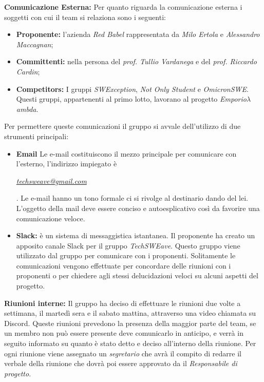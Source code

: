 \textbf{Comunicazione Esterna:}
Per quanto riguarda la comunicazione esterna i soggetti con cui il team si relaziona sono i seguenti:
\begin{itemize}
    \item \textbf{Proponente:} l'azienda \textit{Red Babel} rappresentata da \textit{Milo Ertola} e \textit{Alessandro Maccagnan};
    \item \textbf{Committenti:} nella persona del \textit{prof. Tullio Vardanega} e del \textit{prof. Riccardo Cardin};
    \item \textbf{Competitors:} I gruppi \textit{SWException}, \textit{Not Only Student} e \textit{OmicronSWE}. Questi gruppi, appartenenti al primo lotto, lavorano al progetto \textit{Emporio\(\lambda\)ambda}.
\end{itemize}
Per permettere queste comunicazioni il gruppo si avvale dell'utilizzo di due strumenti principali:
\begin{itemize}
    \item \textbf{Email}
          Le e-mail costituiscono il mezzo principale per comunicare con l'esterno, l'indirizzo impiegato è
          \begin{center}
              \textit{\href{mailto:techsweave@gmail.com}{techsweave@gmail.com}}\end{center}. Le e-mail hanno un tono formale ci si rivolge al destinario dando del lei. L'oggetto della mail deve essere conciso e autoesplicativo così da favorire una comunicazione veloce.
    \item \textbf{Slack:}
          è un sistema di messaggistica istantanea. Il proponente ha creato un apposito canale Slack per il gruppo \textit{TechSWEave}. Questo gruppo viene utilizzato dal gruppo per comunicare con i proponenti. Solitamente le comunicazioni vengono effettuate per concordare delle riunioni con i proponenti o per chiedere agli stessi delucidazioni veloci su alcuni aspetti del progetto.
\end{itemize}
\textbf{Riunioni interne:}
Il gruppo ha deciso di effettuare le riunioni due volte a settimana, il martedì sera e il sabato mattina, attraverso una video chiamata su Discord. Queste riunioni prevedono la presenza della maggior parte del team, se un membro non può essere presente deve comunicarlo in anticipo, e verrà in seguito informato su quanto è stato detto e deciso all'interno della riunione. Per ogni riunione viene assegnato un \textit{segretario} che avrà il compito di redarre il verbale della riunione che dovrà poi essere approvato da il \textit{Responsabile di progetto}.
